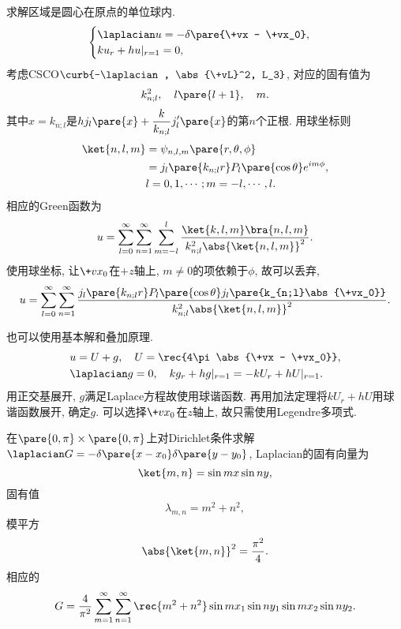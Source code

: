 \documentclass[hidelinks]{ctexart}
\begin{document}
\begin{sample}
    \begin{ex}
        求解区域是圆心在原点的单位球内.
        \[ \begin{cases}
            \laplacian u = -\delta\pare{\+vx - \+vx_0}, \\
            ku_r + hu\vert_{r=1} = 0,
        \end{cases} \]
        考虑CSCO$\curb{-\laplacian, \abs{\+vL}^2, L_3}$, 对应的固有值为
        \[ k_{n;l}^2,\quad l\pare{l+1},\quad m. \]
        其中$x = k_{n;l}$是$\displaystyle hj_l\pare{x} + \frac{k}{k_{n;l}}j'_l\pare{x}$的第$n$个正根. 用球坐标则
        \begin{align*}
            \ket{n,l,m} &= \psi_{n,l,m}\pare{r,\theta,\phi} \\
            &= j_l\pare{k_{n;l}r}P_l\pare{\cos\theta}e^{im\phi}, \\
            & l = 0,1,\cdots; m = -l,\cdots,l.
        \end{align*}
        相应的Green函数为
        \[ u = \sum_{l=0}^\infty \sum_{n=1}^\infty \sum_{m=-l}^l \frac{\ket{k,l,m}\bra{n,l,m}}{k_{n;l}^2 \abs{\ket{n,l,m}}^2}. \]
        使用球坐标, 让$\+vx_0$在$+z$轴上, $m\neq 0$的项依赖于$\phi$, 故可以丢弃,
        \[ u = \sum_{l=0}^\infty \sum_{n=1}^\infty \frac{j_l\pare{k_{n;l}r} P_l\pare{\cos\theta} j_l\pare{k_{n;l}\abs{\+vx_0}}}{k_{n;l}^2 \abs{\ket{n,l,m}}^2}. \]
    \end{ex}
\end{sample}
\begin{sample}
    \begin{ex}
        也可以使用基本解和叠加原理.
        \begin{align*}
            & u = U + g,\quad U = \rec{4\pi\abs{\+vx - \+vx_0}},\\ &\laplacian g=0,\quad kg_r + hg\vert_{r=1} = -kU_r + hU\vert_{r=1}.
        \end{align*}
        用正交基展开, $g$满足Laplace方程故使用球谐函数. 再用加法定理将$kU_r + hU$用球谐函数展开, 确定$g$. 可以选择$\+vx_0$在$z$轴上, 故只需使用Legendre多项式.
    \end{ex}
\end{sample}
\begin{sample}
    \begin{ex}
        在$\pare{0,\pi}\times \pare{0,\pi}$上对Dirichlet条件求解$\laplacian G = -\delta\pare{x-x_0}\delta\pare{y-y_0}$, Laplacian的固有向量为
        \[ \ket{m,n} = \sin mx \sin ny, \]
        固有值
        \[ \lambda_{m,n} = m^2 + n^2, \]
        模平方
        \[ \abs{\ket{m,n}}^2 = \frac{\pi^2}{4}. \]
        相应的
        \[ G = \frac{4}{\pi^2}\sum_{m=1}^\infty\sum_{n=1}^\infty \rec{m^2 + n^2} \sin mx_1 \sin ny_1 \sin mx_2 \sin ny_2. \]
    \end{ex}
\end{sample}
\end{document}
